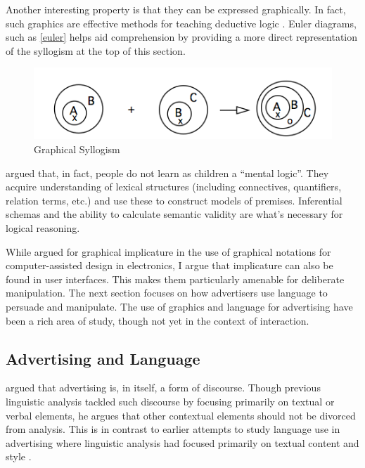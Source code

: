 Another interesting property is that they can be expressed graphically. In fact, such graphics are effective methods for teaching deductive logic  \citep{Stenning:1995ka}.  Euler diagrams, such as  \autoref{euler}  helps aid comprehension by providing a more direct representation of the syllogism at the top of this section.


\begin{figure}
\centerline{
  \includegraphics[scale=.75]{chapter3.tex/syllogism}
  }
\caption{Graphical Syllogism \citep{Stenning:1995ka}}
\label{euler}
\end{figure}


 \cite{JohnsonLaird:2007ua}  argued that, in fact, people do not learn as children a ``mental logic''. They acquire understanding of lexical structures (including connectives, quantifiers, relation terms, etc.) and use these to construct models of premises. Inferential schemas and the ability to calculate semantic validity are what's necessary for logical reasoning.

While  \cite{Oberlander:1995vv}  argued for graphical implicature in the use of graphical notations for computer-assisted design in electronics, I argue that implicature can also be found in user interfaces. This makes them particularly amenable for deliberate manipulation. The next section focuses on how advertisers use language to persuade and manipulate. The use of graphics and language for advertising have been a rich area of study, though not yet in the context of interaction.

\subsection{Advertising and Language}
\label{advertisingandlanguage}


\cite{Cook:2001up} argued that advertising is, in itself, a form of discourse.  Though previous linguistic analysis tackled such discourse by focusing primarily on textual or verbal elements, he argues that other contextual elements should not be divorced from analysis.  This is in contrast to earlier attempts to study language use in advertising where linguistic analysis had focused primarily on textual content and style \citep{Leech:1966wr,Vestergaard:1985vna}.

